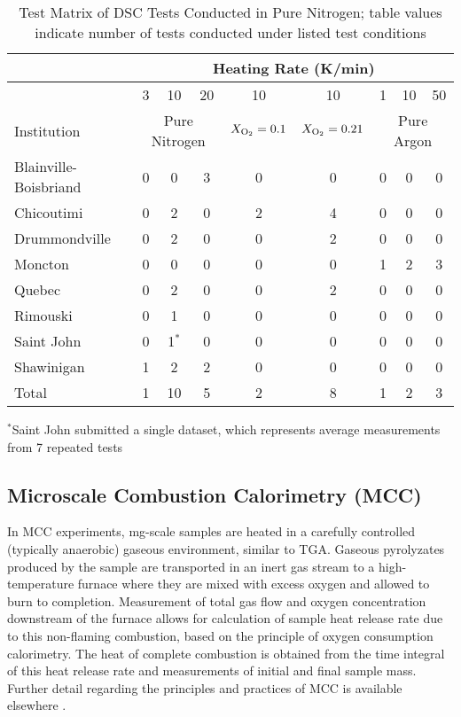 \documentclass{book}
\begin{document}
\begin{table}
\caption{Test Matrix of DSC Tests Conducted in Pure Nitrogen; table values indicate number of tests conducted under listed test conditions}
\label{Table_5}
\begin{center}
\begin{tabular}{lcccccccc}
                      & \multicolumn{8}{c}{Heating Rate (K/min)} \\ \hline
                      & 3 & 10 & 20 & 10 & 10 & 1  & 10 & 50 \\ \hline
Institution           & \multicolumn{3}{c}{Pure Nitrogen} & $X_{\rm O_2}=0.1$ & $X_{\rm O_2}=0.21$ & \multicolumn{3}{c}{Pure Argon}  \\ \hline
Blainville-Boisbriand & 0 & 0     &     3 & 0 & 0 & 0 & 0 & 0 \\
Chicoutimi            & 0 & 2     &     0 & 2 & 4 & 0 & 0 & 0 \\
Drummondville         & 0 & 2     &     0 & 0 & 2 & 0 & 0 & 0 \\
Moncton               & 0 & 0     &     0 & 0 & 0 & 1 & 2 & 3 \\
Quebec                & 0 & 2     &     0 & 0 & 2 & 0 & 0 & 0 \\
Rimouski              & 0 & 1     &     0 & 0 & 0 & 0 & 0 & 0 \\
Saint John            & 0 & 1$^*$ &     0 & 0 & 0 & 0 & 0 & 0 \\
Shawinigan            & 1 & 2     &     2 & 0 & 0 & 0 & 0 & 0 \\ \hline
Total                 & 1 & 10    &     5 & 2 & 8 & 1 & 2 & 3 \\ \hline
\end{tabular}
\end{center}
$^*$Saint John submitted a single dataset, which represents average measurements from 7 repeated tests
\end{table}

\subsection{Microscale Combustion Calorimetry (MCC)}

In MCC experiments, mg-scale samples are heated in a carefully controlled (typically anaerobic) gaseous environment, similar to TGA. Gaseous pyrolyzates produced by the sample are transported in an inert gas stream to a high-temperature furnace where they are mixed with excess oxygen and allowed to burn to completion. Measurement of total gas flow and oxygen concentration downstream of the furnace allows for calculation of sample heat release rate due to this non-flaming combustion, based on the principle of oxygen consumption calorimetry. The heat of complete combustion is obtained from the time integral of this heat release rate and measurements of initial and final sample mass. Further detail regarding the principles and practices of MCC is available elsewhere \cite{lyon2013principles}.
\end{document}
